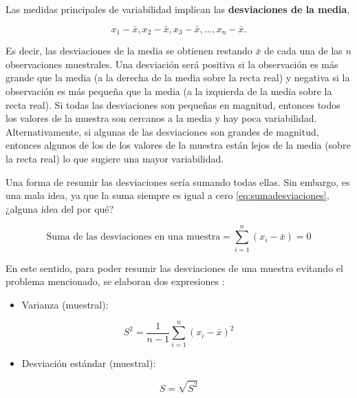 \documentclass[
]{book}
\providecommand{\tightlist}{%
  \setlength{\itemsep}{0pt}\setlength{\parskip}{0pt}}
\theoremstyle{definition}
\theoremstyle{definition}
\theoremstyle{definition}
\theoremstyle{definition}
\theoremstyle{remark}
\begin{document}
Las medidas principales de variabilidad implican las \textbf{desviaciones de la media},

\begin{equation}
x_1 - \bar{x}, x_2 - \bar{x}, x_3 - \bar{x}, \ldots, x_n - \bar{x}.
\label{eq:desviaciones}
\end{equation}

Es decir, las desviaciones de la media se obtienen restando \(\bar{x}\) de cada una de las \(n\) observaciones muestrales. Una desviación será positiva si la observación es más grande que la media (a la derecha de la media sobre la recta real) y negativa si la observación es más pequeña que la media (a la izquierda de la media sobre la recta real). Si todas las desviaciones son pequeñas en magnitud, entonces todos los valores de la muestra son cercanos a la media y hay poca variabilidad. Alternativamente, si algunas de las desviaciones son grandes de magnitud, entonces algunos de los de los valores de la muestra están lejos de la media (sobre la recta real) lo que sugiere una mayor variabilidad.

Una forma de resumir las desviaciones sería sumando todas ellas. Sin embargo, es una mala idea, ya que la suma siempre es igual a cero \eqref{eq:sumadesviaciones}, ¿alguna idea del por qué?

\begin{equation}
\text{Suma de las desviaciones en una muestra} = \sum_{i=1}^{n}(x_i-\bar{x}) = 0
\label{eq:sumadesviaciones}
\end{equation}

En este sentido, para poder resumir las desviaciones de una muestra evitando el problema mencionado, se elaboran dos expresiones \citep[página 32]{Devore}:

\begin{itemize}
\tightlist
\item
  Varianza (muestral):
\end{itemize}

\begin{equation}
S^2= \frac{1}{n-1}\sum_{i=1}^{n}(x_i-\bar{x})^2
\label{eq:varianzamuestral}
\end{equation}

\begin{itemize}
\tightlist
\item
  Desviación estándar (muestral):
\end{itemize}

\begin{equation}
S = \sqrt{S^2}
\label{eq:demuestral}
\end{equation}
\end{document}
